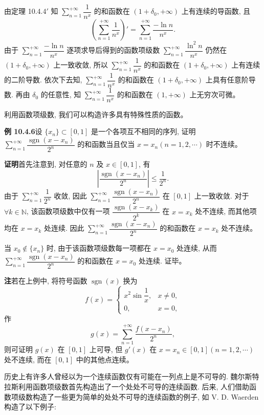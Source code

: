 \documentclass[UTF8,12pt,a4paper,fontset=fandol]{ctexart}
\begin{document}
由定理 10.4.4$'$ 知 $\sum\limits_{n=1}^{+\infty}\dfrac1{n^x}$ 的和函数在 $(1+\delta_0,+\infty)$ 上有连续的导函数, 且
\[
  \left(\sum_{n=1}^{+\infty}\frac1{n^x}\right)'
  =\sum_{n=1}^{+\infty}\frac{-\ln n}{n^x}.
\]
由于 $\sum\limits_{n=1}^{+\infty}\dfrac{-\ln n}{n^x}$ 逐项求导后得到的函数项级数 $\sum\limits_{n=1}^{+\infty}\dfrac{\ln^2 n}{n^x}$ 仍然在 $(1+\delta_0,+\infty)$ 上一致收敛, 所以 $\sum\limits_{n=1}^{+\infty}\dfrac1{n^x}$ 的和函数在 $(1+\delta_0,+\infty)$ 上有连续的二阶导数. 依次下去知, $\sum\limits_{n=1}^{+\infty}\dfrac1{n^x}$ 的和函数在 $(1+\delta_0,+\infty)$ 上具有任意阶导数. 再由 $\delta_0$ 的任意性, 知 $\sum\limits_{n=1}^{+\infty}\dfrac1{n^x}$ 的和函数在 $(1,+\infty)$ 上无穷次可微。

利用函数项级数, 我们可以构造许多具有特殊性质的函数。

\noindent\textbf{例 10.4.6}\quad 设 $\{x_n\}\subset[0,1]$ 是一个各项互不相同的序列, 证明 $\sum\limits_{n=1}^{+\infty}\dfrac{\operatorname{sgn}(x-x_n)}{2^n}$ 的和函数当且仅当 $x=x_n(n=1,2,\cdots)$ 时不连续。

\noindent\textbf{证明}\quad 首先注意到, 对任意的 $n$ 及 $x\in[0,1]$, 有
\[
  \left|\frac{\operatorname{sgn}(x-x_n)}{2^n}\right|\leq\frac1{2^n}.
\]
由于 $\sum\limits_{n=1}^{+\infty}\dfrac1{2^n}$ 收敛, 因此 $\sum\limits_{n=1}^{+\infty}\dfrac{\operatorname{sgn}(x-x_n)}{2^n}$ 在 $[0,1]$ 上一致收敛. 对于 $\forall k\in\mathbb N$, 该函数项级数中仅有一项 $\dfrac{\operatorname{sgn}(x-x_k)}{2^k}$ 在 $x=x_k$ 处不连续, 而其他项均在 $x=x_k$ 处连续. 因此 $\sum\limits_{n=1}^{+\infty}\dfrac{\operatorname{sgn}(x-x_n)}{2^n}$ 的和函数在 $x=x_k$ 处不连续。

当 $x_0\notin\{x_n\}$ 时, 由于该函数项级数每一项都在 $x=x_0$ 处连续, 从而 $\sum\limits_{n=1}^{+\infty}\dfrac{\operatorname{sgn}(x-x_n)}{2^n}$ 的和函数在 $x=x_0$ 处连续. 证毕。

\noindent\textbf{注}\quad 若在上例中, 将符号函数 $\operatorname{sgn}(x)$ 换为
\[
  f(x)=
  \begin{cases}
    x^2\sin\dfrac1x, & x\ne0,\\
    0, & x=0,
  \end{cases}
\]
作
\[
  g(x)=\sum_{n=1}^{+\infty}\frac{f(x-x_n)}{2^n},
\]
则可证明 $g(x)$ 在 $[0,1]$ 上可导, 但 $g'(x)$ 在 $x=x_n\in[0,1](n=1,2,\cdots)$ 处不连续, 而在 $[0,1]$ 中的其他点连续。

历史上有许多人曾经以为一个连续函数仅有可能在一列点上是不可导的. 魏尔斯特拉斯利用函数项级数首先构造出了一个处处不可导的连续函数. 后来, 人们借助函数项级数构造了一些更为简单的处处不可导的连续函数的例子, 如 V. D. Waerden 构造了以下例子:
\end{document}
